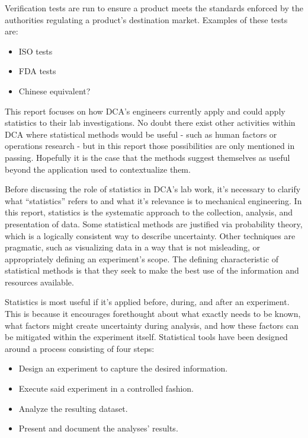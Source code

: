 \documentclass[11pt,a4paper,article]{memoir} %
\begin{document}
\par
Verification tests are run to ensure a product meets the standards enforced by the authorities regulating a product's destination market. Examples of these tests are:
\begin{itemize}
	\item ISO tests
	\item FDA tests
	\item Chinese equivalent?
\end{itemize}
\par
This report focuses on how DCA's engineers currently apply and could apply statistics to their lab investigations. No doubt there exist other activities within DCA where statistical methods would be useful - such as human factors or operations research - but in this report those possibilities are only mentioned in passing. Hopefully it is the case that the methods suggest themselves as useful beyond the application used to contextualize them.
\par
Before discussing the role of statistics in DCA's lab work, it's necessary to clarify what ``statistics'' refers to and what it's relevance is to mechanical engineering. In this report, statistics is the systematic approach to the collection, analysis, and presentation of data. Some statistical methods are justified via probability theory, which is a logically consistent way to describe uncertainty. Other techniques are pragmatic, such as visualizing data in a way that is not misleading, or appropriately defining an experiment's scope. The defining characteristic of statistical methods is that they seek to make the best use of the information and resources available.
\par
Statistics is most useful if it's applied before, during, and after an experiment. This is because it encourages forethought about what exactly needs to be known, what factors might create uncertainty during analysis, and how these factors can be mitigated within the experiment itself. Statistical tools have been designed around a process consisting of four steps:
\begin{itemize}
\item Design an experiment to capture the desired information.
\item Execute said experiment in a controlled fashion.
\item Analyze the resulting dataset.
\item Present and document the analyses' results.
\end{itemize}
\end{document}
